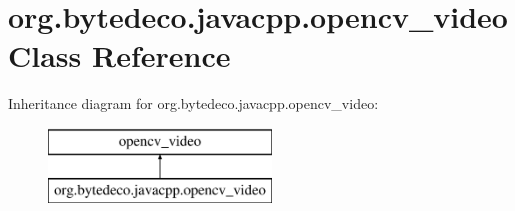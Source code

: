 \hypertarget{classorg_1_1bytedeco_1_1javacpp_1_1opencv__video}{}\section{org.\+bytedeco.\+javacpp.\+opencv\+\_\+video Class Reference}
\label{classorg_1_1bytedeco_1_1javacpp_1_1opencv__video}
Inheritance diagram for org.\+bytedeco.\+javacpp.\+opencv\+\_\+video\+:\begin{figure}[H]
\begin{center}
\leavevmode
\includegraphics[height=2.000000cm]{classorg_1_1bytedeco_1_1javacpp_1_1opencv__video}
\end{center}
\end{figure}
